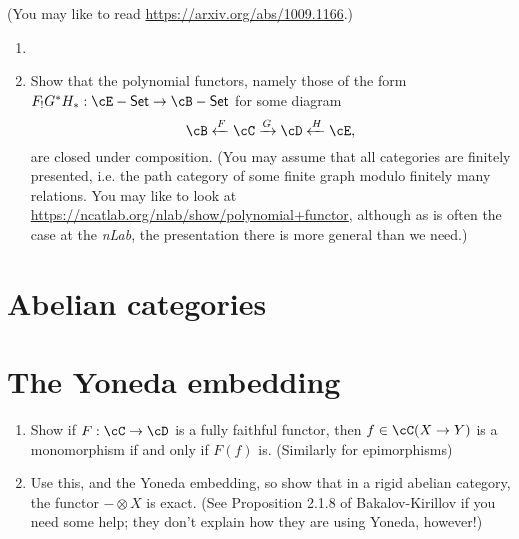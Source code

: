 \documentclass[12pt]{amsart}
\begin{document}
\begin{enumerate}
(You may like to read \url{https://arxiv.org/abs/1009.1166}.)
\begin{enumerate}
	\item {}
	\item Show that the polynomial functors, namely those of the form $F_! G^* H_* : \cE-\mathsf{Set} \to \cB-\mathsf{Set}$ for some diagram $$\cB \xleftarrow{F} \cC \xrightarrow{G} \cD \xleftarrow{H} \cE,$$ are closed under composition. (You may assume that all categories are finitely presented, i.e. the path category of some finite graph modulo finitely many relations. You may like to look at \url{https://ncatlab.org/nlab/show/polynomial+functor}, although as is often the case at the \emph{nLab}, the presentation there is more general than we need.) 
\end{enumerate}
\end{enumerate}

\section{Abelian categories}

\section{The Yoneda embedding}
\begin{enumerate}
\item Show if $F:\cC\to\cD$ is a fully faithful functor, then $f \in \cC(X \to Y)$ is a monomorphism if and only if $F(f)$ is. (Similarly for epimorphisms)
\item Use this, and the Yoneda embedding, so show that in a rigid abelian category, the functor $- \otimes X$ is exact. (See Proposition 2.1.8 of Bakalov-Kirillov if you need some help; they don't explain how they are using Yoneda, however!)
\end{enumerate}
\end{document}
